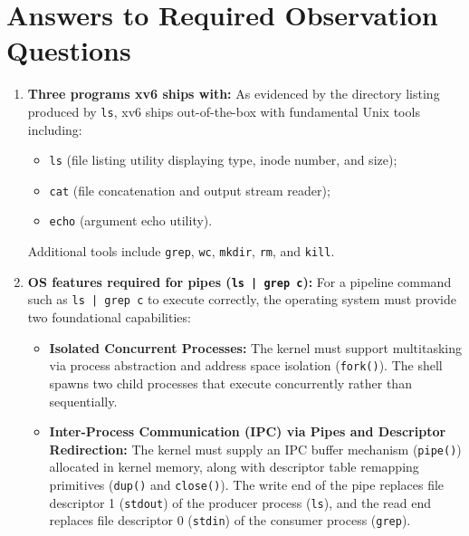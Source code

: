 \documentclass[12pt,a4paper]{report}
\numberwithin{equation}{chapter}
\numberwithin{figure}{chapter}
\numberwithin{table}{chapter}
\begin{document}
\section{Answers to Required Observation Questions}
\begin{enumerate}
    \item \textbf{Three programs xv6 ships with:}
    As evidenced by the directory listing produced by \texttt{ls}, xv6 ships out-of-the-box with fundamental Unix tools including:
    \begin{itemize}
        \item \texttt{ls} (file listing utility displaying type, inode number, and size);
        \item \texttt{cat} (file concatenation and output stream reader);
        \item \texttt{echo} (argument echo utility).
    \end{itemize}
    Additional tools include \texttt{grep}, \texttt{wc}, \texttt{mkdir}, \texttt{rm}, and \texttt{kill}.
    
    \item \textbf{OS features required for pipes (\texttt{ls | grep c}):}
    For a pipeline command such as \texttt{ls | grep c} to execute correctly, the operating system must provide two foundational capabilities:
    \begin{itemize}
        \item \textbf{Isolated Concurrent Processes:} The kernel must support multitasking via process abstraction and address space isolation (\texttt{fork()}). The shell spawns two child processes that execute concurrently rather than sequentially.
        \item \textbf{Inter-Process Communication (IPC) via Pipes and Descriptor Redirection:} The kernel must supply an IPC buffer mechanism (\texttt{pipe()}) allocated in kernel memory, along with descriptor table remapping primitives (\texttt{dup()} and \texttt{close()}). The write end of the pipe replaces file descriptor 1 (\texttt{stdout}) of the producer process (\texttt{ls}), and the read end replaces file descriptor 0 (\texttt{stdin}) of the consumer process (\texttt{grep}).
    \end{itemize}


\end{enumerate}
\end{document}

